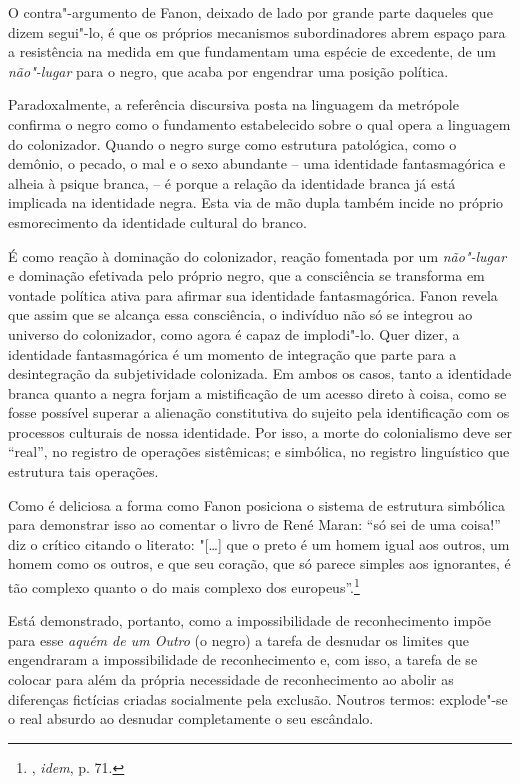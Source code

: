 O contra"-argumento de Fanon, deixado de lado por grande parte daqueles
que dizem segui"-lo, é que os próprios mecanismos subordinadores abrem
espaço para a resistência na medida em que fundamentam uma espécie de
excedente, de um \emph{não"-lugar} para o negro, que acaba por engendrar
uma posição política.

Paradoxalmente, a referência discursiva posta na linguagem da metrópole
confirma o negro como o fundamento estabelecido sobre o qual opera a
linguagem do colonizador. Quando
o negro surge como estrutura patológica, como o demônio, o pecado, o mal
e o sexo abundante -- uma identidade fantasmagórica e alheia à psique
branca, -- é porque a relação da identidade branca já está implicada na
identidade negra. Esta via de mão dupla também incide no próprio
esmorecimento da identidade cultural do branco.

É como reação à dominação do
colonizador, reação fomentada por um \emph{não"-lugar} e dominação
efetivada pelo próprio negro, que a consciência se transforma em vontade
política ativa para afirmar sua identidade fantasmagórica. Fanon revela
que assim que se alcança essa consciência, o indivíduo não só se
integrou ao universo do colonizador, como agora é capaz de implodi"-lo.
Quer dizer, a identidade fantasmagórica é um momento de integração que
parte para a desintegração da subjetividade colonizada. Em ambos os
casos, tanto a identidade branca quanto a negra forjam a mistificação de
um acesso direto à coisa, como se fosse possível superar a alienação
constitutiva do sujeito pela identificação com os processos culturais de
nossa identidade. Por isso, a morte do colonialismo deve ser ``real'', no
registro de operações sistêmicas; e simbólica, no registro linguístico
que estrutura tais operações.

Como é deliciosa a forma como Fanon posiciona o sistema de estrutura
simbólica para demonstrar isso ao comentar o livro de René Maran: ``só
sei de uma coisa!'' diz o crítico citando o literato: "{[}\ldots{}{]} que o
preto é um homem igual aos outros, um homem como os outros, e que seu
coração, que só parece simples aos ignorantes, é tão complexo quanto o
do mais complexo dos europeus''.\footnote{, \emph{idem}, p. 71.}

Está demonstrado, portanto, como a impossibilidade de reconhecimento
impõe para esse \emph{aquém de um Outro} (o negro) a tarefa de desnudar
os limites que engendraram a impossibilidade de reconhecimento e, com
isso, a tarefa de se colocar para além da própria necessidade de
reconhecimento ao abolir as diferenças fictícias criadas socialmente
pela exclusão. Noutros termos: explode"-se o real absurdo ao desnudar
completamente o seu escândalo.

